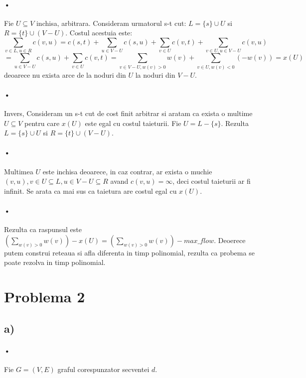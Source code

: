 \documentclass[paper=a4, fontsize=11pt]{scrartcl}
\begin{document}
\paragraph{•}
Fie $U\subseteq V$ inchisa, arbitrara. Consideram urmatorul s-t cut: $L=\{s\}\cup U$ si $R=\{t\}\cup (V-U)$. Costul acestuia este:
\[ \sum_{v\in L, u\in R} c(v,u) = c(s,t) + \sum_{u\in V-U} c(s,u) + \sum_{v\in U} c(v,t) + \sum_{v\in U,u\in V-U} c(v,u) \]
\[ = \sum_{u\in V-U} c(s,u) + \sum_{v\in U} c(v,t) = \sum_{v\in V-U, w(v)>0} w(v) + \sum_{v\in U, w(v)<0} (-w(v)) = x(U) \]
deoarece nu exista arce de la noduri din $U$ la noduri din $V-U$.

\paragraph{•}
Invers, Consideram un s-t cut de cost finit arbitrar si aratam ca exista o multime $U\subseteq V$ pentru care $x(U)$ este egal cu costul taieturii. Fie $U=L-\{s\}$. Rezulta $L=\{s\}\cup U$ si $R=\{t\}\cup (V-U)$.

\paragraph{•}
Multimea $U$ este inchisa deoarece, in caz contrar, ar exista o muchie $(v,u),v\in U\subseteq L, u\in V-U\subseteq R$ avand $c(v,u)=\infty$, deci costul taieturii ar fi infinit. Se arata ca mai sus ca taietura are costul egal cu $x(U)$.

\paragraph{•}
Rezulta ca raspunsul este $\left(\sum_{w(v)>0} w(v)\right) - x(U) = \left(\sum_{w(v)>0} w(v)\right) - max\_flow$. Deoerece putem construi reteaua si afla diferenta in timp polinomial, rezulta ca probema se poate rezolva in timp polinomial.

\newpage
\section*{Problema 2}
\subsection*{a)}

\paragraph{•}
Fie $G=(V, E)$ graful corespunzator secventei $d$.
\end{document}
